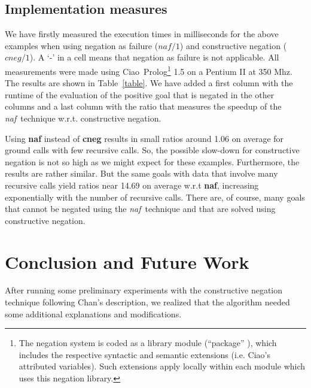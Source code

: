 \documentclass{llncs}
\newcommand{\naf}{{\em naf}}\newcommand{\viejo}[1]{}
\newcommand{\ciao}{Ciao}
\begin{document}
\subsection{Implementation measures}

We have firstly measured the execution times in milliseconds for the
above examples when using negation as failure ($naf/1$) and
constructive negation ($cneg/1$). A `-' in a cell means that negation
as failure is not applicable. All measurements were made using \ciao\
Prolog\footnote{The negation system is coded as a library module
(``package'' \cite{ciao-modules-cl2000}), which includes the
respective syntactic and semantic extensions (i.e. Ciao's
attributed variables). Such extensions apply locally within each
module which uses this negation library.} 1.5 on a Pentium II at 350
Mhz. The results are shown in Table~\ref{table}. We have added a first
column with the runtime of the evaluation of the positive goal that is
negated in the other columns and a last column with the ratio that
measures the speedup of the \naf\ technique w.r.t. constructive
negation.

Using {\bf naf} instead of {\bf cneg} results in small ratios around
1.06 on average for ground calls with few recursive calls. So, the
possible slow-down for constructive negation is not so high as we
might expect for these examples. Furthermore, the results are rather
similar. But the same goals with data that involve many recursive
calls yield ratios near 14.69 on average w.r.t {\bf naf},
increasing exponentially with the number of recursive calls. There
are, of course, many goals that cannot be negated using the \naf\
technique and that are solved using constructive negation.

 


\vspace{-1em}
\section{Conclusion and Future Work}
\label{conclusion}
\vspace{-1em}
After running some preliminary experiments with the constructive 
negation technique  following Chan's description, we realized that the
algorithm needed some additional explanations and modifications.
\end{document}
